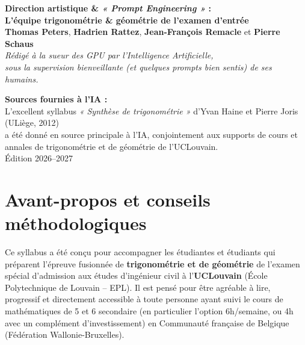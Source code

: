 \documentclass[11pt,a4paper,oneside]{book}
\begin{document}
\begin{titlepage}

    \vfill

    {\large \textbf{Direction artistique \& \emph{« Prompt Engineering »} :}}\\[0.2cm]
    {\Large \textbf{L'équipe trigonométrie \& géométrie de l'examen d'entrée}}\\[0.15cm]
    {\large \textbf{Thomas Peters}, \textbf{Hadrien Rattez}, \textbf{Jean-François Remacle} et \textbf{Pierre Schaus}}\\[0.3cm]
    {\normalsize \emph{Rédigé à la sueur des GPU par l'Intelligence Artificielle,\\ sous la supervision bienveillante (et quelques prompts bien sentis) de ses humains.}}

    \vspace{0.6cm}
    {\small \textbf{Sources fournies à l'IA :}\\
    L'excellent syllabus \emph{« Synthèse de trigonométrie »} d'Yvan Haine et Pierre Joris (ULiège, 2012)\\
    a été donné en source principale à l'IA, conjointement aux supports de cours et annales de trigonométrie et de géométrie de l'UCLouvain.}\\[0.4cm]
    {\normalsize Édition 2026--2027}
\end{titlepage}

\chapter*{Avant-propos et conseils méthodologiques}

Ce syllabus a été conçu pour accompagner les étudiantes et étudiants qui préparent l'épreuve fusionnée de \textbf{trigonométrie et de géométrie} de l'examen spécial d'admission aux études d'ingénieur civil à l'\textbf{UCLouvain} (École Polytechnique de Louvain -- EPL). Il est pensé pour être agréable à lire, progressif et directement accessible à toute personne ayant suivi le cours de mathématiques de 5\ieme{} et 6\ieme{} secondaire (en particulier l'option 6h/semaine, ou 4h avec un complément d'investissement) en Communauté française de Belgique (Fédération Wallonie-Bruxelles).
\end{document}
